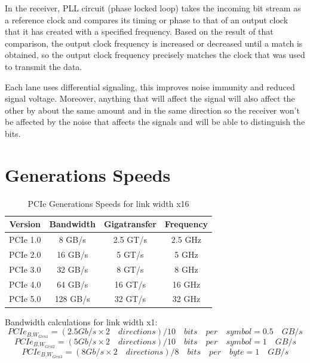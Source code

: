 In the receiver, PLL circuit (phase locked loop) takes the incoming bit stream as a
reference clock and compares its timing or phase to that of an output clock that it has
created with a specified frequency. Based on the result of that comparison, the output
clock frequency is increased or decreased until a match is obtained, so the output clock
frequency precisely matches the clock that was used to transmit the data. \newline 

Each lane uses differential signaling, this improves noise immunity and reduced signal
voltage. Moreover, anything that will affect the signal will also affect the other by about
the same amount and in the same direction so the receiver won’t be affected by the
noise that affects the signals and will be able to distinguish the bits.

\section{Generations Speeds}

\begin{table}[H]
\caption{PCIe Generations Speeds for link width x16}
    \centering
    \begin{tabular}{|c|c|c|c|}
    \hline
    
    Version & Bandwidth & Gigatransfer & Frequency \\ \hline \hline
         PCIe 1.0  & 8 GB/s & 2.5 GT/s & 2.5 GHz \\ \hline
         PCIe 2.0  & 16 GB/s & 5 GT/s & 5 GHz \\ \hline
         PCIe 3.0  & 32 GB/s & 8 GT/s & 8 GHz \\ \hline
         PCIe 4.0  & 64 GB/s & 16 GT/s & 16 GHz \\ \hline
         PCIe 5.0  & 128 GB/s & 32 GT/s & 32 GHz \\ \hline
    \end{tabular}

    \label{tab:my_label}
\end{table}
Bandwidth calculations for link width x1:
\begin{equation}
    PCIe_{{B.W}_{Gen1}} = (2.5 Gb/s \times 2 \quad directions)/10 \quad bits \quad per \quad symbol = 0.5 \quad GB/s
\end{equation}
\begin{equation}
    PCIe_{{B.W}_{Gen2}} = (5 Gb/s \times 2 \quad directions)/10 \quad bits \quad per \quad symbol = 1 \quad GB/s
\end{equation}
\begin{equation}
    PCIe_{{B.W}_{Gen3}} = (8 Gb/s \times 2 \quad directions)/8 \quad bits \quad per \quad byte = 1 \quad GB/s
\end{equation}

